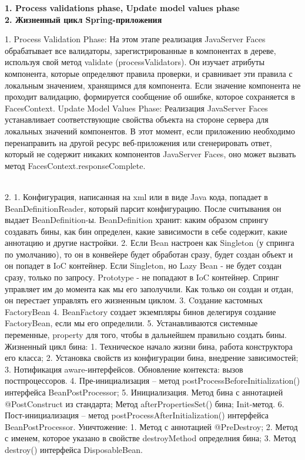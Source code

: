 \documentclass{article}
\newcommand{\bil}[4]{%
    \begin{minipage}{.3\textwidth}
        \textbf{1. #1} \\
        \textbf{2. #2}

        1. #3
        \\
        2. #4
    \end{minipage}
}
\begin{document}
\hfill
\bil{Process validations phase, Update model values phase}{Жизненный цикл Spring-приложения}{
    Process Validation Phase: 
    На этом этапе реализация JavaServer Faces обрабатывает все валидаторы, зарегистрированные в компонентах в дереве, используя свой метод validate (processValidators). 
    Он изучает атрибуты компонента, которые определяют правила проверки, и сравнивает эти правила с локальным значением, хранящимся для компонента. 
    Если значение компонента не проходит валидацию, формируется сообщение об ошибке, которое сохраняется в FacesContext.
    Update Model Values Phase: 
    Реализация JavaServer Faces устанавливает соответствующие свойства объекта на стороне сервера для локальных значений компонентов. 
    В этот момент, если приложению необходимо перенаправить на другой ресурс веб-приложения или сгенерировать ответ, 
    который не содержит никаких компонентов JavaServer Faces, оно может вызвать метод FacesContext.responseComplete.
}{
    1. Конфигурация, написанная на xml или в виде Java кода, попадает в BeanDefinitionReader, который парсит конфигурацию. 
    После считывания он выдает BeanDefinition-ы. BeanDefinition хранит: каким образом спрингу создавать бины, как бин определен, какие зависимости в себе содержит, какие аннотацию и другие настройки.
    2. Если Bean настроен как Singleton (у спринга по умолчанию), то он в конвейере будет обработан сразу, будет создан объект и он попадет в IoC контейнер. 
    Если Singleton, но Lazy Bean - не будет создан сразу, только по запросу.
    Prototype - не попадают в IoC контейнер. Спринг управляет им до момента как мы его заполучили. 
    Как только он создан и отдан, он перестает управлять его жизненным циклом.
    3. Cоздание кастомных FactoryBean
    4. BeanFactory создает экземпляры бинов делегируя создание FactoryBean, если мы его определили.
    5. Устанавливаются системные переменные, property для того, чтобы в дальнейшем правильно создать бины.
    Жизненный цикл бина:
    1. Техническое начало жизни бина, работа конструктора его класса;
    2. Установка свойств из конфигурации бина, внедрение зависимостей;
    3. Нотификация aware-интерфейсов. Обновление контекста: вызов постпроцессоров.
    4. Пре-инициализация – метод postProcessBeforeInitialization() интерфейса BeanPostProcessor;
    5. Инициализация. Метод бина с аннотацией @PostConstruct из стандарта;
    Метод afterPropertiesSet() бина; Init-метод.
    6. Пост-инициализация – метод postProcessAfterInitialization() интерфейса BeanPostProcessor.
    Уничтожение:
    1. Метод с аннотацией @PreDestroy;
    2. Метод с именем, которое указано в свойстве destroyMethod определния бина;
    3. Метод destroy() интерфейса DisposableBean.
}
\end{document}
